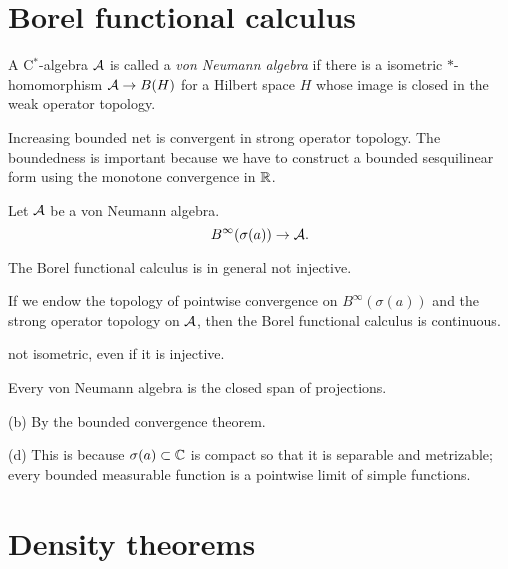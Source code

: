 \documentclass{../../large}
\begin{document}
\section{Borel functional calculus}

\begin{prb}
A C$^*$-algebra $\mathcal{A}$ is called a \emph{von Neumann algebra} if there is a isometric $*$-homomorphism $\mathcal{A}\to B(H)$ for a Hilbert space $H$ whose image is closed in the weak operator topology.
\end{prb}

\begin{prb}
Increasing bounded net is convergent in strong operator topology.
The boundedness is important because we have to construct a bounded sesquilinear form using the monotone convergence in $\mathbb{R}$.
\end{prb}




\begin{prb}
Let $\mathcal{A}$ be a von Neumann algebra.
\[B^\infty(\sigma(a))\to\mathcal{A}.\]
\begin{parts}
\item The Borel functional calculus is in general not injective.
\item If we endow the topology of pointwise convergence on $B^\infty(\sigma(a))$ and the strong operator topology on $\mathcal{A}$, then the Borel functional calculus is continuous.
\item not isometric, even if it is injective.
\item Every von Neumann algebra is the closed span of projections.
\end{parts}
\end{prb}
\begin{prb}

(b)
By the bounded convergence theorem.

(d)
This is because $\sigma(a)\subset\mathbb{C}$ is compact so that it is separable and metrizable; every bounded measurable function is a pointwise limit of simple functions.

\end{prb}



\section{Density theorems}
\end{document}

